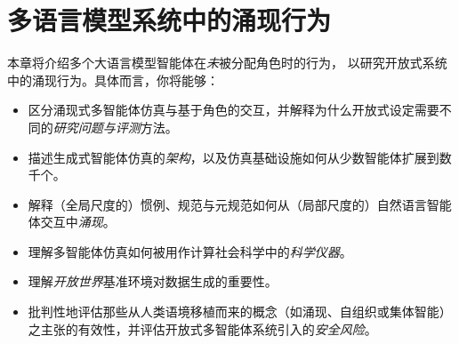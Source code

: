 

\chapter{多语言模型系统中的涌现行为}\label{chap:emergent}






\begin{learningbox}
本章将介绍多个大语言模型智能体在{\em 未}被分配角色时的行为，%
以研究开放式系统中的涌现行为。具体而言，你将能够：
\begin{itemize}[leftmargin=*, nosep]
    \item 区分涌现式多智能体仿真与基于角色的交互，并解释为什么开放式设定需要不同的{\em 研究问题与评测}方法。
    \item 描述生成式智能体仿真的{\em 架构}，以及仿真基础设施如何从少数智能体扩展到数千个。
    \item 解释（全局尺度的）惯例、规范与元规范如何从（局部尺度的）自然语言智能体交互中{\em 涌现}。
    \item 理解多智能体仿真如何被用作计算社会科学中的{\em 科学仪器}。
    \item 理解{\em 开放世界}基准环境对数据生成的重要性。
    \item 批判性地评估那些从人类语境移植而来的概念（如涌现、自组织或集体智能）之主张的有效性，并评估开放式多智能体系统引入的{\em 安全风险}。
\end{itemize}
\end{learningbox}


